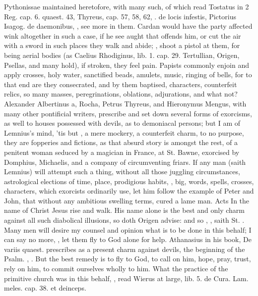 {Pythonissae maintained heretofore, with many such, of which read
Tostatus in 2 Reg. cap. 6. quaest. 43, Thyreus, cap. 57, 58, 62, \etc{}. de
locis infestis, Pictorius Isagog. de daemonibus, \etc{}, see more in them.
Cardan would have the party affected wink altogether in such a case, if
he see aught that offends him, or cut the air with a sword in such
places they walk and abide; , shoot a
pistol at them, for being aerial bodies (as Caelius Rhodiginus, lib. 1.
cap. 29. Tertullian, Origen, Psellas, and many hold), if stroken, they
feel pain. Papists commonly enjoin and apply crosses, holy water,
sanctified beads, amulets, music, ringing of bells, for to that end are
they consecrated, and by them baptised, characters, counterfeit relics,
so many masses, peregrinations, oblations, adjurations, and what not?
Alexander Albertinus a, Rocha, Petrus Thyreus, and Hieronymus Mengus,
with many other pontificial writers, prescribe and set down several
forms of exorcisms, as well to houses possessed with devils, as to
demoniacal persons; but I am of Lemnius's mind, 'tis but , a mere mockery, a counterfeit charm,
to no purpose, they are fopperies and fictions, as that absurd
story is amongst the rest, of a penitent woman seduced by a
magician in France, at St. Bawne, exorcised by Domphius, Michaelis, and
a company of circumventing friars. If any man (saith Lemnius) will
attempt such a thing, without all those juggling circumstances,
astrological elections of time, place, prodigious habits, , big,
 words, spells, crosses, characters, which exorcists
ordinarily use, let him follow the example of Peter and John, that
without any ambitious swelling terms, cured a lame man. Acts  In
the name of Christ Jesus rise and walk. His name alone is the best and
only charm against all such diabolical illusions, so doth Origen
advise: and so \Chrysostom{}, , saith St. \Austin{}. Many men will desire my counsel
and opinion what is to be done in this behalf; I can say no more, , let
them fly to God alone for help. Athanasius in his book, \textlatin{De variis
quaest.} prescribes as a present charm against devils, the beginning of
the  Psalm. , \etc{}. But the best
remedy is to fly to God, to call on him, hope, pray, trust, rely on
him, to commit ourselves wholly to him. What the practice of the
primitive church was in this behalf, ,
read Wierus at large, \textlatin{lib. 5. de Cura. Lam. meles. cap. 38. et
deinceps}.

}
